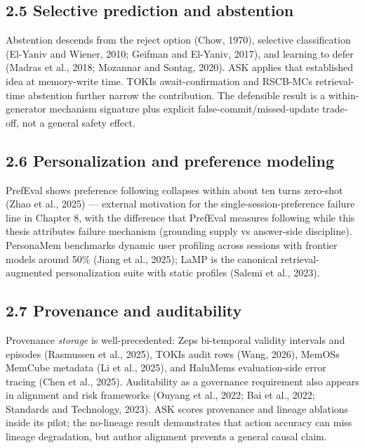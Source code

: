 \subsection{2.5 Selective prediction and
abstention}\label{selective-prediction-and-abstention}

Abstention descends from the reject option (Chow, 1970), selective
classification (El-Yaniv and Wiener, 2010; Geifman and El-Yaniv, 2017),
and learning to defer (Madras et al., 2018; Mozannar and Sontag, 2020).
ASK applies that established idea at memory-write time.
TOKI\textquotesingle s await-confirmation and RSCB-MC\textquotesingle s
retrieval-time abstention further narrow the contribution. The
defensible result is a within-generator mechanism signature plus
explicit false-commit/missed-update trade-off, not a general safety
effect.

\subsection{2.6 Personalization and preference
modeling}\label{personalization-and-preference-modeling}

PrefEval shows preference following collapses within about ten turns
zero-shot (Zhao et al., 2025) --- external motivation for the
single-session-preference failure line in Chapter 8, with the difference
that PrefEval measures following while this thesis attributes failure
mechanism (grounding supply vs answer-side discipline). PersonaMem
benchmarks dynamic user profiling across sessions with frontier models
around 50\% (Jiang et al., 2025); LaMP is the canonical
retrieval-augmented personalization suite with static profiles (Salemi
et al., 2023).

\subsection{2.7 Provenance and
auditability}\label{provenance-and-auditability}

Provenance \emph{storage} is well-precedented: Zep\textquotesingle s
bi-temporal validity intervals and episodes (Rasmussen et al., 2025),
TOKI\textquotesingle s audit rows (Wang, 2026), MemOS\textquotesingle s
MemCube metadata (Li et al., 2025), and HaluMem\textquotesingle s
evaluation-side error tracing (Chen et al., 2025). Auditability as a
governance requirement also appears in alignment and risk frameworks
(Ouyang et al., 2022; Bai et al., 2022; Standards and Technology, 2023).
ASK scores provenance and lineage ablations inside its pilot; the
no-lineage result demonstrates that action accuracy can miss lineage
degradation, but author alignment prevents a general causal claim.

